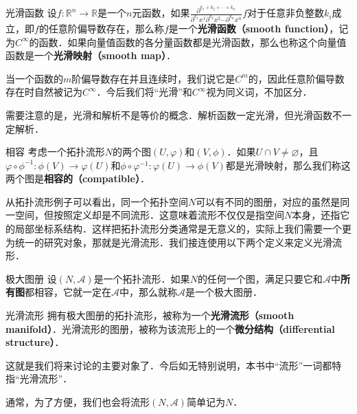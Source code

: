 \begin{definition}{光滑函数}
设$f:\mathbb{R}^n\rightarrow\mathbb{R}$是一个$n$元函数，如果$\frac{\partial^{k_1+k_2+\cdots+k_n}}{\partial^{k_1}x^1\partial^{k_2}x^2\cdots\partial^{k_n}x^n} f$对于任意非负整数$k_i$成立，即$f$的任意阶偏导数存在，那么称$f$是一个\textbf{光滑函数（smooth function）}，记为$C^\infty$的函数．如果向量值函数的各分量函数都是光滑函数，那么也称这个向量值函数是一个\textbf{光滑映射（smooth map）}．
\end{definition}

当一个函数的$m$阶偏导数存在并且连续时，我们说它是$C^m$的，因此任意阶偏导数存在时自然被记为$C^\infty$．今后我们将“光滑”和$C^\infty$视为同义词，不加区分．

需要注意的是，光滑和解析不是等价的概念．解析函数一定光滑，但光滑函数不一定解析．

\begin{definition}{相容}
考虑一个拓扑流形$N$的两个图$(U, \varphi)$和$(V, \phi)$．如果$U\cap V\not=\varnothing$，且$\varphi\circ\phi^{-1}:\phi(V)\rightarrow\varphi(U)$和$\phi\circ\varphi^{-1}:\varphi(U)\rightarrow\phi(V)$都是光滑映射，那么我们称这两个图是\textbf{相容的（compatible）}．
\end{definition}

从拓扑流形例子可以看出，同一个拓扑空间$N$可以有不同的图册，对应的虽然是同一空间，但按照定义却是不同流形．这意味着流形不仅仅是指空间$N$本身，还指它的局部坐标系结构．这样把拓扑流形分类通常是无意义的，实际上我们需要一个更为统一的研究对象，那就是光滑流形．我们接连使用以下两个定义来定义光滑流形．

\begin{definition}{极大图册}
设$(N, \mathcal{A})$是一个拓扑流形．如果$N$的任何一个图，满足只要它和$\mathcal{A}$中\textbf{所有图}都相容，它就一定在$\mathcal{A}$中，那么就称$\mathcal{A}$是一个极大图册．
\end{definition}

\begin{definition}{光滑流形}
拥有极大图册的拓扑流形，被称为一个\textbf{光滑流形（smooth manifold）}．光滑流形的图册，被称为该流形上的一个\textbf{微分结构（differential structure）}．
\end{definition}

这就是我们将来讨论的主要对象了．今后如无特别说明，本书中“流形”一词都特指“光滑流形”．

通常，为了方便，我们也会将流形$(N, \mathcal{A})$简单记为$N$．





